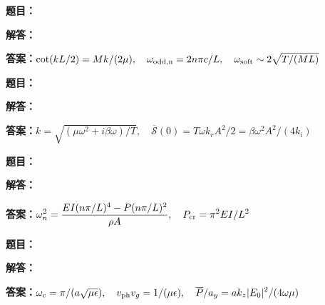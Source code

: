 \documentclass[lang=cn,color=blue,11pt]{elegantbook}
\begin{document}
\par
\noindent\textbf{题目：}
\par\noindent\textbf{解答：}
\par\noindent\textbf{答案：}\(\displaystyle \cot(kL/2)=Mk/(2\mu),\quad \omega_{\rm odd,n}=2n\pi c/L,\quad \omega_{\rm soft}\sim2\sqrt{T/(ML)}\)\par
\par\smallskip\noindent\hrulefill\par\medskip
{}\par
\noindent\textbf{题目：}
\par\noindent\textbf{解答：}
\par\noindent\textbf{答案：}\(\displaystyle k=\sqrt{(\mu\omega^2+i\beta\omega)/T},\quad \overline{\mathcal S}(0)=T\omega k_rA^2/2=\beta\omega^2A^2/(4k_i)\)\par
\par\smallskip\noindent\hrulefill\par\medskip
{}\par
\noindent\textbf{题目：}
\par\noindent\textbf{解答：}
\par\noindent\textbf{答案：}\(\displaystyle \omega_n^2=\frac{EI(n\pi/L)^4-P(n\pi/L)^2}{\rho A},\quad P_{\rm cr}=\pi^2EI/L^2\)\par
\par\smallskip\noindent\hrulefill\par\medskip
{}\par
\noindent\textbf{题目：}
\par\noindent\textbf{解答：}
\par\noindent\textbf{答案：}\(\displaystyle \omega_c=\pi/(a\sqrt{\mu\epsilon}),\quad v_{\rm ph}v_g=1/(\mu\epsilon),\quad\overline P/a_y=ak_z|E_0|^2/(4\omega\mu)\)\par
\par\smallskip\noindent\hrulefill\par\medskip
\end{document}
